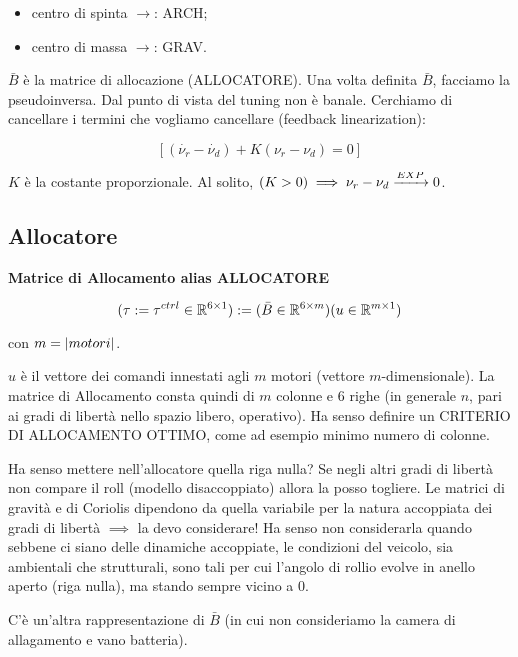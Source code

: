 \begin{itemize}

\item{centro di spinta $\rightarrow$}: ARCH;
\item{centro di massa $\rightarrow$}: GRAV.

\end{itemize}

$\bar{B}$ è la matrice di allocazione (ALLOCATORE). Una volta definita $\bar{B}$, facciamo la pseudoinversa. Dal punto di vista del tuning non è banale. Cerchiamo di cancellare i termini che vogliamo cancellare (feedback linearization):

\[
	[(\dot{\nu_r}-\dot{\nu_d}) + K(\nu_r-\nu_d)=0]
\]

$K$ è la costante proporzionale. Al solito, $(K>0) \implies \nu_r-\nu_d \tendsto{EXP}0$.

\subsection{Allocatore}

\begin{defn}{\textbf{Matrice di Allocamento alias ALLOCATORE}}

\[
	(\tau := \tau^{ctrl}\in\mathbb{R}^{6\times 1}) := (\bar{B}\in\mathbb{R}^{6\times m})(u\in\mathbb{R}^{m\times 1})
\]

con $m=\left\vert{motori}\right\vert$.

\end{defn}

$u$ è il vettore dei comandi innestati agli $m$ motori (vettore $m$-dimensionale). La matrice di Allocamento consta quindi di $m$ colonne e 6 righe (in generale $n$, pari ai gradi di libertà nello spazio libero, operativo). Ha senso definire un CRITERIO DI ALLOCAMENTO OTTIMO, come ad esempio minimo numero di colonne.

Ha senso mettere nell'allocatore quella riga nulla? Se negli altri gradi di libertà non compare il roll (modello disaccoppiato) allora la posso togliere. Le matrici di gravità e di Coriolis dipendono da quella variabile per la natura accoppiata dei gradi di libertà $\implies$ la devo considerare!
Ha senso non considerarla quando sebbene ci siano delle dinamiche accoppiate, le condizioni del veicolo, sia ambientali che strutturali, sono tali per cui l'angolo di rollio evolve in anello aperto (riga nulla), ma stando sempre vicino a 0. 

C'è un'altra rappresentazione di $\bar{B}$ (in cui non consideriamo la camera di allagamento e vano batteria). 

